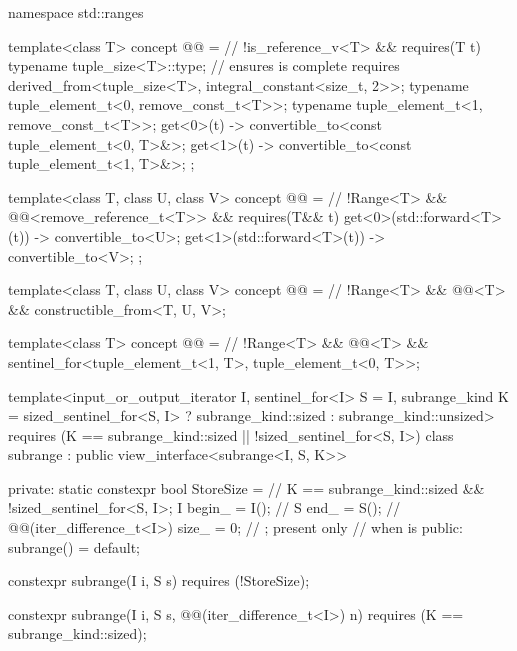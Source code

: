 %
\begin{codeblock}
namespace std::ranges {
  template<class T>
    concept @@ =                                    // \expos
      !is_reference_v<T> && requires(T t) {
        typename tuple_size<T>::type;   // ensures  is complete
        requires derived_from<tuple_size<T>, integral_constant<size_t, 2>>;
        typename tuple_element_t<0, remove_const_t<T>>;
        typename tuple_element_t<1, remove_const_t<T>>;
        { get<0>(t) } -> convertible_to<const tuple_element_t<0, T>&>;
        { get<1>(t) } -> convertible_to<const tuple_element_t<1, T>&>;
      };

  template<class T, class U, class V>
    concept @@ =                     // \expos
      !Range<T> && @@<remove_reference_t<T>> &&
      requires(T&& t) {
        { get<0>(std::forward<T>(t)) } -> convertible_to<U>;
        { get<1>(std::forward<T>(t)) } -> convertible_to<V>;
      };

  template<class T, class U, class V>
    concept @@ =                   // \expos
      !Range<T> && @@<T> && constructible_from<T, U, V>;

  template<class T>
    concept @@ =                       // \expos
      !Range<T> && @@<T> &&
      sentinel_for<tuple_element_t<1, T>, tuple_element_t<0, T>>;

  template<input_or_output_iterator I, sentinel_for<I> S = I, subrange_kind K =
      sized_sentinel_for<S, I> ? subrange_kind::sized : subrange_kind::unsized>
    requires (K == subrange_kind::sized || !sized_sentinel_for<S, I>)
  class subrange : public view_interface<subrange<I, S, K>> {
  private:
    static constexpr bool StoreSize =                      // \expos
      K == subrange_kind::sized && !sized_sentinel_for<S, I>;
    I begin_ = I();                                        // \expos
    S end_ = S();                                          // \expos
    @@(iter_difference_t<I>) size_ = 0;  // \expos; present only
                                                           // when  is 
  public:
    subrange() = default;

    constexpr subrange(I i, S s) requires (!StoreSize);

    constexpr subrange(I i, S s, @@(iter_difference_t<I>) n)
      requires (K == subrange_kind::sized);

}}
\end{codeblock}
